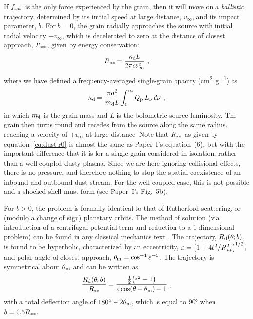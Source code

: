 If \(f_{\text{rad}}\) is the only force experienced by the grain, then it will
move on a \textit{ballistic} trajectory, determined by its initial
speed at large distance, \(v_\infty\), and its impact parameter, \(b\).
For \(b = 0\), the grain radially approaches the source with initial
radial velocity \(-v_\infty\), which is decelerated to zero at the distance
of closest approach, \(R_{**}\), given by energy conservation:
\begin{equation}
  \label{eq:dust-r0}
  R_{**} = \frac{\kappa_{\text{d}} L} {2 \pi c v_\infty^2} \ ,
\end{equation}
where we have defined a frequency-averaged single-grain opacity
(\si{cm^2.g^{-1}}) as
\begin{equation}
  \label{eq:kappa-grain}
  \kappa_{\text{d}} = \frac{\pi a^2}{m_{\text{d}} L} \int_0^\infty Q_{\text{p}} \, L_\nu \, d\nu \ ,
\end{equation}
in which \(m_{\text{d}}\) is the grain mass and \(L\) is the bolometric
source luminosity.  The grain then turns round and recedes from the
source along the same radius, reaching a velocity of \(+v_\infty\) at large
distance.  Note that \(R_{**}\) as given by
equation~\eqref{eq:dust-r0} is almost the same as Paper~I's
equation~(6), but with the important difference that it is for a
single grain considered in isolation, rather than a well-coupled dusty
plasma.  Since we are here ignoring collisional effects, there is no
pressure, and therefore nothing to stop the spatial coexistence of an
inbound and outbound dust stream.  For the well-coupled case, this is
not possible and a shocked shell must form (see Paper~I's Fig.~5b).

For \(b > 0\), the problem is formally identical to that of Rutherford
scattering, or (modulo a change of sign) planetary orbits.  The method
of solution (via introduction of a centrifugal potential term and
reduction to a 1-dimensional problem) can be found in any classical
mechanics text \citep[e.g.,][\S~14]{Landau:1976a}.  The trajectory,
\(R_{\text{d}}(\theta; b)\), is found to be hyperbolic, characterized by an
eccentricity,
\(\varepsilon = \bigl( 1 + 4 b^2 / R_{**}^2\bigr)^{1/2}\), and polar angle
of closest approach, \(\theta_{\text{m}} = \cos^{-1} \varepsilon^{-1}\).  The trajectory is
symmetrical about \(\theta_{\text{m}}\) and can be written as
\begin{equation}
  \label{eq:dust-r-theta}
  \frac{R_{\text{d}}(\theta; b)} {R_{**}} = 
  \frac{ \tfrac12 \bigl( \varepsilon^2 - 1 \bigr)} {\varepsilon \cos(\theta - \theta_{\text{m}}) - 1} \ , 
\end{equation}
with a total deflection angle of \(\ang{180} - 2 \theta_{\text{m}}\), which is equal to
\ang{90} when \(b = 0.5 R_{**}\).

